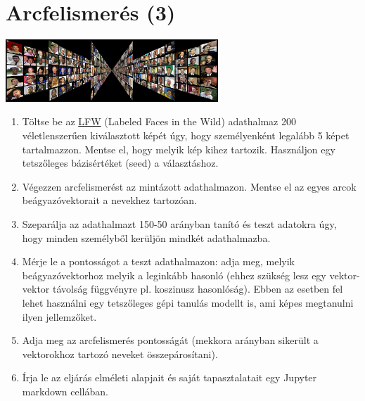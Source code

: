 \documentclass[english]{article}
\begin{document}
\section{Arcfelismerés (3)}
\begin{center}
\includegraphics[width=8cm, keepaspectratio]{images/lfw.jpg}
\end{center}
\begin{enumerate}
	\item Töltse be az \href{http://vis-www.cs.umass.edu/lfw/#download}{LFW} (Labeled Faces in the Wild) adathalmaz 200 véletlenszerűen kiválasztott képét úgy, hogy személyenként legalább 5 képet tartalmazzon. Mentse el, hogy melyik kép kihez tartozik. Használjon egy tetszőleges bázisértéket (seed) a választáshoz.
	\item Végezzen arcfelismerést az mintázott adathalmazon. Mentse el az egyes arcok beágyazóvektorait a nevekhez tartozóan. 
	\item Szeparálja az adathalmazt 150-50 arányban tanító és teszt adatokra úgy, hogy minden személyből kerüljön mindkét adathalmazba.
	\item Mérje le a pontosságot a teszt adathalmazon: adja meg, melyik beágyazóvektorhoz melyik a leginkább hasonló (ehhez szükség lesz egy vektor-vektor távolság függvényre pl. koszinusz hasonlóság). Ebben az esetben fel lehet használni egy tetszőleges gépi tanulás modellt is, ami képes megtanulni ilyen jellemzőket. 
	\item Adja meg az arcfelismerés pontosságát (mekkora arányban sikerült a vektorokhoz tartozó neveket összepárosítani).
	\item Írja le az eljárás elméleti alapjait és saját tapasztalatait egy Jupyter markdown cellában.
\end{enumerate}
\end{document}
